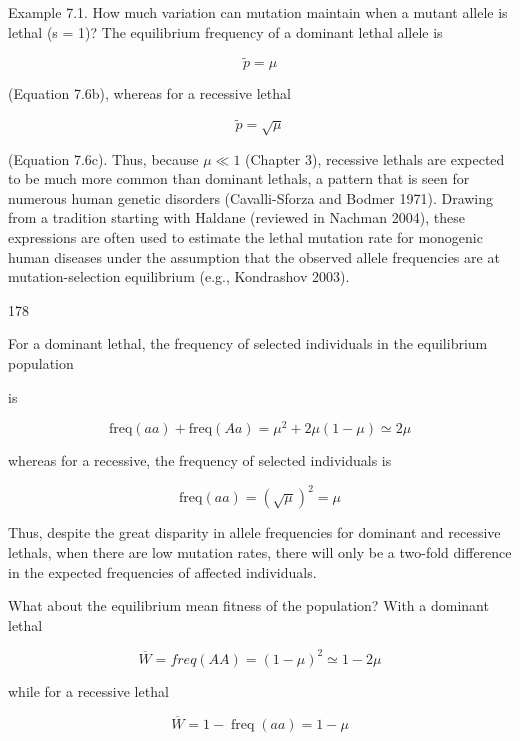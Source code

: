 \documentclass{article}
\begin{document}
Example 7.1. How much variation can mutation maintain when a mutant allele is lethal (s = 1)? The equilibrium frequency of a dominant lethal allele is

\begin{equation}
\widetilde{p}=\mu
\end{equation}

(Equation 7.6b), whereas for a recessive lethal

\begin{equation}
\tilde{p}=\sqrt{\mu}
\end{equation}

(Equation 7.6c). Thus, because  $ \mu \ll 1 $ (Chapter 3), recessive lethals are expected to be much more common than dominant lethals, a pattern that is seen for numerous human genetic disorders (Cavalli-Sforza and Bodmer 1971). Drawing from a tradition starting with Haldane (reviewed in Nachman 2004), these expressions are often used to estimate the lethal mutation rate for monogenic human diseases under the assumption that the observed allele frequencies are at mutation-selection equilibrium (e.g., Kondrashov 2003).

178

For a dominant lethal, the frequency of selected individuals in the equilibrium population

is

\begin{equation}
\mathrm{f r e q}(a a)+\mathrm{f r e q}(A a)=\mu^{2}+2\mu(1-\mu)\simeq2\mu
\end{equation}

whereas for a recessive, the frequency of selected individuals is

\begin{equation}
\mathrm{f r e q}(a a)=(\sqrt{\mu})^{2}=\mu
\end{equation}

Thus, despite the great disparity in allele frequencies for dominant and recessive lethals, when there are low mutation rates, there will only be a two-fold difference in the expected frequencies of affected individuals.

What about the equilibrium mean fitness of the population? With a dominant lethal

\begin{equation}
\overline{W}=freq(AA)=(1-\mu)^{2}\simeq1-2\mu
\end{equation}

while for a recessive lethal

\begin{equation}
\overline{W}=1-\operatorname{f r e q}(a a)=1-\mu
\end{equation}
\end{document}
